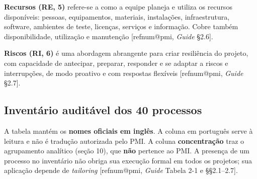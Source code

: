 \documentclass[12pt,a4paper,article,oneside,english,brazil]{abntex2}
\makeatletter
\newcommand{\refnum}[1]{\csname refnum@#1\endcsname}
\makeatother
\begin{document}
\textbf{Recursos (RE, 5)} refere-se a como a equipe planeja e utiliza os recursos disponíveis: pessoas, equipamentos, materiais, instalações, infraestrutura, software, ambientes de teste, licenças, serviços e informação. Cobre também disponibilidade, utilização e manutenção [\refnum{pmi}, \textit{Guide} §2.6].

\textbf{Riscos (RI, 6)} é uma abordagem abrangente para criar resiliência do projeto, com capacidade de antecipar, preparar, responder e se adaptar a riscos e interrupções, de modo proativo e com respostas flexíveis [\refnum{pmi}, \textit{Guide} §2.7].
\subsection{Inventário auditável dos 40 processos}

A tabela mantém os \textbf{nomes oficiais em inglês}. A coluna em português serve à leitura e não é tradução autorizada pelo PMI. A coluna \textbf{concentração} traz o agrupamento analítico (seção 10), que \textbf{não} pertence ao PMI. A presença de um processo no inventário não obriga sua execução formal em todos os projetos; sua aplicação depende de \textit{tailoring} [\refnum{pmi}, \textit{Guide} Tabela 2-1 e §§2.1–2.7].
\end{document}
